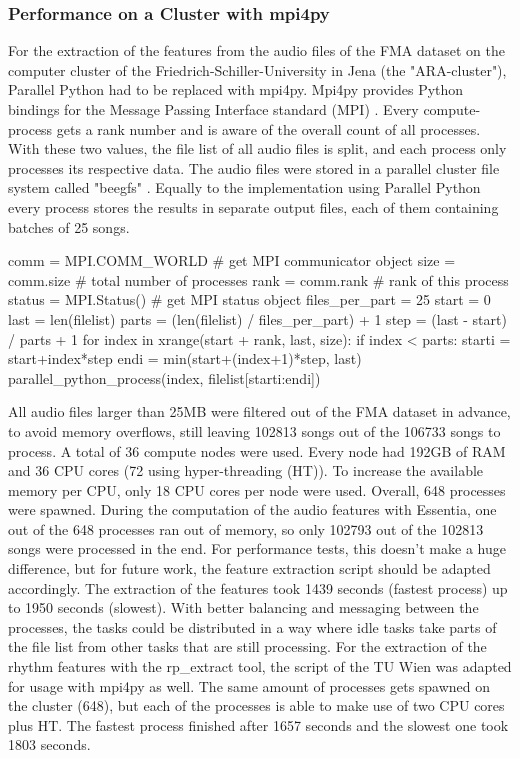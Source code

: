 \subsubsection{Performance on a Cluster with mpi4py}\label{mpi4py}

For the extraction of the features from the audio files of the FMA dataset on the computer cluster of the Friedrich-Schiller-University in Jena (the "ARA-cluster"), Parallel Python had to be replaced with mpi4py. 
Mpi4py provides Python bindings for the Message Passing Interface standard (MPI) \cite{mpi4py}. 
Every compute-process gets a rank number and is aware of the overall count of all processes. With these two values, the file list of all audio files is split, and each process only processes its respective data. The audio files were stored in a parallel cluster file system called "beegfs" \cite{beegfs}. Equally to the implementation using Parallel Python every process stores the results in separate output files, each of them containing batches of 25 songs.\\

\begin{pythonCode}[frame=single,label={lst:mpi4py},caption={Mpi4py},captionpos=b]
comm = MPI.COMM_WORLD   # get MPI communicator object
size = comm.size        # total number of processes
rank = comm.rank        # rank of this process
status = MPI.Status()   # get MPI status object
files_per_part = 25
start = 0
last = len(filelist)
parts = (len(filelist) / files_per_part) + 1
step = (last - start) / parts + 1
for index in xrange(start + rank, last, size):
    if index < parts:        
        starti = start+index*step
        endi = min(start+(index+1)*step, last)
        parallel_python_process(index, filelist[starti:endi])
\end{pythonCode}

\noindent All audio files larger than 25MB were filtered out of the FMA dataset in advance, to avoid memory overflows, still leaving 102813 songs out of the 106733 songs to process. A total of 36 compute nodes were used. Every node had 192GB of RAM and 36 CPU cores (72 using hyper-threading (HT)). To increase the available memory per CPU, only 18 CPU cores per node were used. Overall, 648 processes were spawned. During the computation of the audio features with Essentia, one out of the 648 processes ran out of memory, so only 102793 out of the 102813 songs were processed in the end. For performance tests, this doesn't make a huge difference, but for future work, the feature extraction script should be adapted accordingly. 
The extraction of the features took 1439 seconds (fastest process) up to 1950 seconds (slowest). With better balancing and messaging between the processes, the tasks could be distributed in a way where idle tasks take parts of the file list from other tasks that are still processing. 
\noindent For the extraction of the rhythm features with the rp\_extract tool, the script of the TU Wien was adapted for usage with mpi4py as well. The same amount of processes gets spawned on the cluster (648), but each of the processes is able to make use of two CPU cores plus HT. The fastest process finished after 1657 seconds and the slowest one took 1803 seconds.

